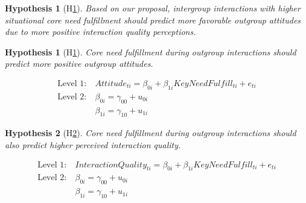\documentclass[man, 12pt, a4paper, mask]{apa7}
\theoremstyle{break}
\theoremstyle{plain}
\newtheorem{hyp}{Hypothesis}
\newtheorem{subhyp}{Hypothesis}
\begin{document}
\begin{mdframed}[style=mdfhypothesis]
    \begin{hyp}[H\ref{hyp:keyNeed}] \label{hyp:keyNeed}
    Based on our proposal, intergroup interactions with higher situational core need fulfillment should predict more favorable outgroup attitudes due to more positive interaction quality perceptions.
    \end{hyp}
    
    \setcounter{subhyp}{0}
    \begin{subhyp}[H\ref{hyp:keyNeedPred}] \label{hyp:keyNeedPred}
    \addtolength{\leftskip}{\subhypskip}
    Core need fulfillment during outgroup interactions should predict more positive outgroup attitudes.
    \end{subhyp}
    
    \begin{fleqn}[\eqskip]
      \begin{equation} \label{eq:SlopesAttCore}
        \begin{split}
            \textrm{Level 1:} &\ Attitude_{ti} = \beta_{0i} + \beta_{1i}KeyNeedFulfill_{ti} + e_{ti}\\
            \textrm{Level 2:} &\ \beta_{0i} = \gamma_{00} + u_{0i} \\
                              &\ \beta_{1i} = \gamma_{10} + u_{1i}
        \end{split}
      \end{equation}
    \end{fleqn}
    
    \begin{subhyp}[H\ref{hyp:keyNeedQual}] \label{hyp:keyNeedQual}
    \addtolength{\leftskip}{\subhypskip}
    Core need fulfillment during outgroup interactions should also predict higher perceived interaction quality.
    \end{subhyp}
    
    \begin{fleqn}[\eqskip]
      \begin{equation} \label{eq:SlopesQltCore}
        \begin{split}
            \textrm{Level 1:} &\ InteractionQuality_{ti} = \beta_{0i} + \beta_{1i}KeyNeedFulfill_{ti} + e_{ti}\\
            \textrm{Level 2:} &\ \beta_{0i} = \gamma_{00} + u_{0i} \\
                              &\ \beta_{1i} = \gamma_{10} + u_{1i}
        \end{split}
      \end{equation}
    \end{fleqn}
    

\end{mdframed}
\end{document}
